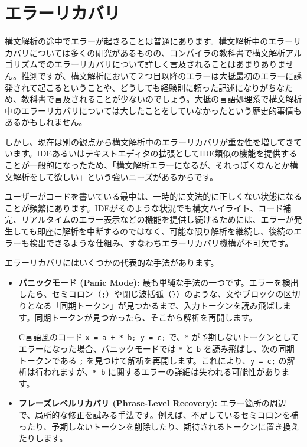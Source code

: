 \hypertarget{chapter7-ux30a8ux30e9ux30fcux30eaux30abux30d0ux30ea}{%
\section{エラーリカバリ}\label{chapter7-ux30a8ux30e9ux30fcux30eaux30abux30d0ux30ea}}

構文解析の途中でエラーが起きることは普通にあります。構文解析中のエラーリカバリについては多くの研究があるものの、コンパイラの教科書で構文解析アルゴリズムでのエラーリカバリについて詳しく言及されることはあまりありません。推測ですが、構文解析において２つ目以降のエラーは大抵最初のエラーに誘発されて起こるということや、どうしても経験則に頼った記述になりがちなため、教科書で言及されることが少ないのでしょう。大抵の言語処理系で構文解析中のエラーリカバリについては大したことをしていなかったという歴史的事情もあるかもしれません。

しかし、現在は別の観点から構文解析中のエラーリカバリが重要性を増してきています。IDEあるいはテキストエディタの拡張としてIDE類似の機能を提供することが一般的になったため、「構文解析エラーになるが、それっぽくなんとか構文解析をして欲しい」という強いニーズがあるからです。

ユーザーがコードを書いている最中は、一時的に文法的に正しくない状態になることが頻繁にあります。IDEがそのような状況でも構文ハイライト、コード補完、リアルタイムのエラー表示などの機能を提供し続けるためには、エラーが発生しても即座に解析を中断するのではなく、可能な限り解析を継続し、後続のエラーも検出できるような仕組み、すなわちエラーリカバリ機構が不可欠です。

エラーリカバリにはいくつかの代表的な手法があります。

\begin{itemize}
\item
  \textbf{パニックモード (Panic Mode):}
  最も単純な手法の一つです。エラーを検出したら、セミコロン（\texttt{;}）や閉じ波括弧（\texttt{\}}）のような、文やブロックの区切りとなる「同期トークン」が見つかるまで、入力トークンを読み飛ばします。同期トークンが見つかったら、そこから解析を再開します。

  C言語風のコード \texttt{x\ =\ a\ +\ *\ b;\ y\ =\ c;} で、\texttt{*}
  が予期しないトークンとしてエラーになった場合、パニックモードでは
  \texttt{*} と \texttt{b} を読み飛ばし、次の同期トークンである
  \texttt{;} を見つけて解析を再開します。これにより、\texttt{y\ =\ c;}
  の解析は行われますが、\texttt{* b}
  に関するエラーの詳細は失われる可能性があります。
\item
  \textbf{フレーズレベルリカバリ (Phrase-Level Recovery):}
  エラー箇所の周辺で、局所的な修正を試みる手法です。例えば、不足しているセミコロンを補ったり、予期しないトークンを削除したり、期待されるトークンに置き換えたりします。
\end{itemize}

